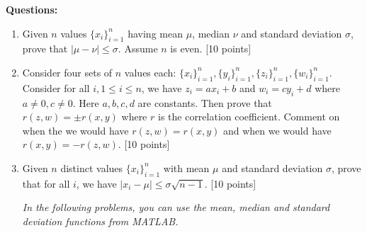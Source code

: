\documentclass[11pt]{article}
\begin{document}
\textbf{Questions:}
\begin{enumerate}
\item Given $n$ values $\{x_i\}_{i=1}^n$ having mean $\mu$, median $\nu$ and standard deviation $\sigma$, prove that $|\mu-\nu| \leq \sigma$. Assume $n$ is even. \textsf{[10 points]}

\item Consider four sets of $n$ values each: $\{x_i\}_{i=1}^n, \{y_i\}_{i=1}^n, \{z_i\}_{i=1}^n, \{w_i\}_{i=1}^n$. Consider for all $i, 1 \leq i \leq n$, we have $z_i = a x_i + b$ and $w_ i = c y_i + d$ where $a \neq 0, c \neq 0$. Here $a,b,c,d$ are constants. Then prove that $r(z,w) = \pm r(x,y)$ where $r$ is the correlation coefficient. Comment on when the we would have $r(z,w) = r(x,y)$ and when we would have $r(x,y) = -r(z,w)$. \textsf{[10 points]}

\item Given $n$ distinct values $\{x_i\}_{i=1}^n$ with mean $\mu$ and standard deviation $\sigma$, prove that for all $i$, we have $|x_i - \mu| \leq \sigma \sqrt{n-1}$. \textsf{[10 points]}

\textit{In the following problems, you can use the mean, median and standard deviation functions from MATLAB.}


\end{enumerate}
\end{document}
